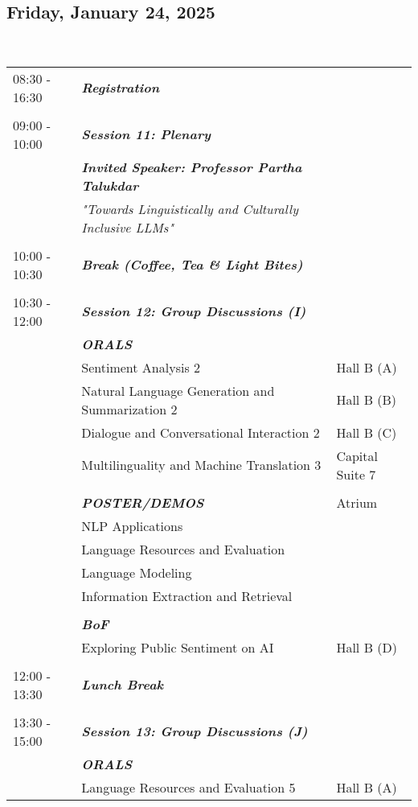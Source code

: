 \subsection{Friday, January 24, 2025}
\\
\begin{longtable}{p{15mm}p{60mm}p{30mm}}
{08:30 - 16:30} & \emph{\textbf{Registration}} & \\\\
{09:00 - 10:00} & \emph{\textbf{Session 11: Plenary}} & \\
& \emph{\textbf{Invited Speaker: Professor Partha Talukdar}} & \\
& \emph{"Towards Linguistically and Culturally Inclusive LLMs"} & \\\\
{10:00 - 10:30} & \emph{\textbf{Break (Coffee, Tea \& Light Bites)}} & \\\\
{10:30 - 12:00} & \emph{\textbf{Session 12: Group Discussions (I)}} & \\
& \emph{\textbf{ORALS}} & \\
& Sentiment Analysis 2 & Hall B (A) \\
& Natural Language Generation and Summarization 2 & Hall B (B) \\
& Dialogue and Conversational Interaction 2 & Hall B (C) \\
& Multilinguality and Machine Translation 3 & Capital Suite 7 \\\\
& \emph{\textbf{POSTER/DEMOS}} & Atrium \\
& NLP Applications & \\
& Language Resources and Evaluation & \\
& Language Modeling & \\
& Information Extraction and Retrieval & \\\\
& \emph{\textbf{BoF}} & \\
& Exploring Public Sentiment on AI & Hall B (D) \\\\
{12:00 - 13:30} & \emph{\textbf{Lunch Break}} & \\\\
{13:30 - 15:00} & \emph{\textbf{Session 13: Group Discussions (J)}} & \\
& \emph{\textbf{ORALS}} & \\
& Language Resources and Evaluation 5 & Hall B (A) \\

\end{longtable}
